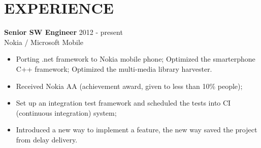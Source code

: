 
\section{EXPERIENCE}
\textbf{Senior SW Engineer} \hfill 2012 - present\\
        Nokia / Microsoft Mobile
        \begin{itemize}  \itemsep -2pt %
        \item Porting .net framework to Nokia mobile phone;
        Optimized the smarterphone C++ framework;
        Optimized the multi-media library harvester.
        \item Received Nokia AA (achievement award, given to less than 10\% people);
        \item Set up an integration test framework
        and scheduled the tests into CI (continuous integration) system;
        \item Introduced a new way to implement a feature,
        the new way saved the project from delay delivery.
        \end{itemize}

